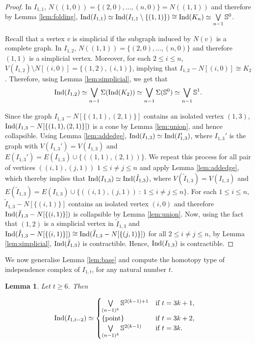 \documentclass[12pt]{article}
\newtheorem{lem}[thm]{Lemma}
\numberwithin{thm}{section}
\theoremstyle{definition}
\newcommand{\bS}{\mathbb{S}}
\newcommand{\ind}{{\rm{Ind}}}
\begin{document}
\begin{proof}
	In $I_{1,1}$, $N((1,0)) = \{(2,0), \ldots, (n,0)\} = N((1,1))$ and therefore  by Lemma \ref{lem:folding}, $\ind(I_{1,1}) \simeq \ind(I_{1,1} \setminus \{(1,1)\}) \cong \ind(K_n) \simeq \bigvee\limits_{n-1} \bS^{0}$.
	
	Recall that a vertex $v$ is simplicial if the subgraph induced by $N(v)$ is a complete graph.	In $I_{1,2}$, $N((1,1)) = \{(2,0), \ldots, (n,0)\}$ and therefore $(1,1)$ is a simplicial vertex. Moreover, for each $2 \leq i \leq n$, $V(I_{1,2}) \setminus N[(i,0)] = \{(1,2), (i,1)\}$, implying that $I_{1,2} - N[(i,0)] \cong K_2$. Therefore, using Lemma \ref{lem:simplicial}, we get that
	$$
	\ind(I_{1,2}) \simeq \bigvee\limits_{n-1} \Sigma(\ind(K_2)) \simeq \bigvee\limits_{n-1} \Sigma(\bS^{0}) \simeq \bigvee\limits_{n-1} \bS^{1}.
	$$
	
	Since the graph $I_{1,3} - N[\{(1,1), (2,1)\}]$ contains an isolated vertex $(1,3)$, $\ind(I_{1,3} - N[\{(1,1), (2,1)\}])$ is a cone by Lemma \ref{lem:union}, and hence collapsible. 
	Using Lemma \ref{lem:addedge}, $\ind(I_{1,3}) \simeq \ind(I_{1,3}')$, where $I_{1,3}'$ is the graph with $V(I_{1,3}') = V(I_{1,3})$ and $E(I_{1,3}') = E(I_{1,3}) \cup \{((1,1), (2,1))\}$.
	We repeat this process for all pair of vertices
	$((i,1), (j,1))$ $ 1\leq i \neq  j \leq n $ and apply Lemma \ref{lem:addedge}, which thereby implies that
	$\ind(I_{1,3}) \simeq \ind(\tilde{I}_{1,3})$, where $V(\tilde{I}_{1,3}) = V(I_{1,3})$ and $E(\tilde{I}_{1,3}) = E(I_{1,3}) \cup \{((i,1),(j,1)) \ : \ 1 \leq i \neq j \leq n\}$. For each $1 \leq i \leq n$, $\tilde{I}_{1,3} - N[\{(i,1)\}]$ contains an isolated vertex $(i,0)$ and therefore $\ind(\tilde{I}_{1,3} - N[\{(i,1)\}])$  is collapsible by Lemma \ref{lem:union}. Now, using the fact that $(1,2)$ is a simplicial vertex in $\tilde{I}_{1,3}$ and $\ind(\tilde{I}_{1,3} - N[\{(i,1)\}]) \cong \ind(\tilde{I}_{1,3} - N[\{(j,1)\}])$ for all $2 \leq i \neq j \leq n$, by Lemma \ref{lem:simplicial}, $\ind(\tilde{I}_{1,3})$ is contractible. Hence, $\ind(I_{1,3})$ is contractible.
	\end{proof}

We now generalise Lemma \ref{lem:base} and compute the homotopy type of independence complex of $I_{1,t}$, for any natural number $t$.

\begin{lem} \label{lem:I_{i,r-2}}Let $t \geq 6$.  Then

\begin{align*}
 \emph{\ind}(I_{1,t-2}) & \simeq \begin{cases}		
       \bigvee\limits_{(n-1)^{k}} \bS^{2(k-1)+1} & \text{if} \ t=3k+1, \\
		  \{\rm{point}\} &  \text{if} \ t=3k+ 2,\\
		\bigvee\limits_{(n-1)^{k}} \bS^{2(k-1)}& \text{if}\  t=3k. \\ 
 \end{cases}
 \end{align*}
\end{lem}
\end{document}
